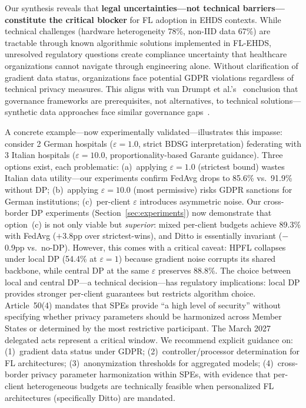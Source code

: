 \documentclass[conference,a4paper]{IEEEtran}
\begin{document}
Our synthesis reveals that \textbf{legal uncertainties---not technical barriers---constitute the critical blocker} for FL adoption in EHDS contexts. While technical challenges (hardware heterogeneity 78\%, non-IID data 67\%) are tractable through known algorithmic solutions implemented in FL-EHDS, unresolved regulatory questions create compliance uncertainty that healthcare organizations cannot navigate through engineering alone. Without clarification of gradient data status, organizations face potential GDPR violations regardless of technical privacy measures. This aligns with van Drumpt et al.'s~\cite{vandrumpt2025pets} conclusion that governance frameworks are prerequisites, not alternatives, to technical solutions---synthetic data approaches face similar governance gaps~\cite{jordon2022synthetic}.

A concrete example---now experimentally validated---illustrates this impasse: consider 2 German hospitals ($\varepsilon{=}1.0$, strict BDSG interpretation) federating with 3 Italian hospitals ($\varepsilon{=}10.0$, proportionality-based Garante guidance). Three options exist, each problematic: (a)~applying $\varepsilon{=}1.0$ (strictest bound) wastes Italian data utility---our experiments confirm FedAvg drops to 85.6\% vs.\ 91.9\% without DP; (b)~applying $\varepsilon{=}10.0$ (most permissive) risks GDPR sanctions for German institutions; (c)~per-client $\varepsilon$ introduces asymmetric noise. Our cross-border DP experiments (Section~\ref{sec:experiments}) now demonstrate that option~(c) is not only viable but \textit{superior}: mixed per-client budgets achieve 89.3\% with FedAvg ($+$3.8pp over strictest-wins), and Ditto is essentially invariant ($-$0.9pp vs.\ no-DP). However, this comes with a critical caveat: HPFL collapses under local DP (54.4\% at $\varepsilon{=}1$) because gradient noise corrupts its shared backbone, while central DP at the same $\varepsilon$ preserves 88.8\%. The choice between local and central DP---a technical decision---has regulatory implications: local DP provides stronger per-client guarantees but restricts algorithm choice. Article~50(4) mandates that SPEs provide ``a high level of security'' without specifying whether privacy parameters should be harmonized across Member States or determined by the most restrictive participant. The March 2027 delegated acts represent a critical window. We recommend explicit guidance on: (1)~gradient data status under GDPR; (2)~controller/processor determination for FL architectures; (3)~anonymization thresholds for aggregated models; (4)~cross-border privacy parameter harmonization within SPEs, with evidence that per-client heterogeneous budgets are technically feasible when personalized FL architectures (specifically Ditto) are mandated.
\end{document}
